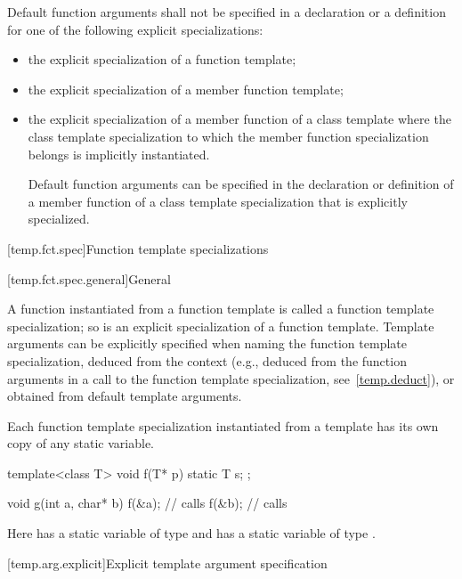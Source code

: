 \pnum
Default function arguments shall not be specified in a declaration or
a definition for one of the following explicit specializations:
\begin{itemize}
\item
the explicit specialization of a function template;
\item
the explicit specialization of a member function template;
\item
the explicit specialization of a member function of a class template where
the class template specialization to which the member function specialization
belongs is implicitly instantiated.
\begin{note}
Default function arguments can be specified in the declaration or
definition of a member function of a class template specialization that is
explicitly specialized.
\end{note}
\end{itemize}

[temp.fct.spec]{Function template specializations}

[temp.fct.spec.general]{General}

\pnum
{}%
A function instantiated from a function template is called a function template
specialization; so is an explicit specialization of a function template.
Template arguments can be explicitly specified when naming the function
template specialization, deduced from the context (e.g.,
deduced from the function arguments in a call to the function template
specialization, see~\ref{temp.deduct}), or obtained from default template arguments.

\pnum
Each function template specialization instantiated from a template
has its own copy of any static variable.
\begin{example}
\begin{codeblock}
template<class T> void f(T* p) {
  static T s;
};

void g(int a, char* b) {
  f(&a);            // calls 
  f(&b);            // calls 
}
\end{codeblock}

Here
has a static variable
of type
and
has a static variable
of type
.
\end{example}

[temp.arg.explicit]{Explicit template argument specification}

